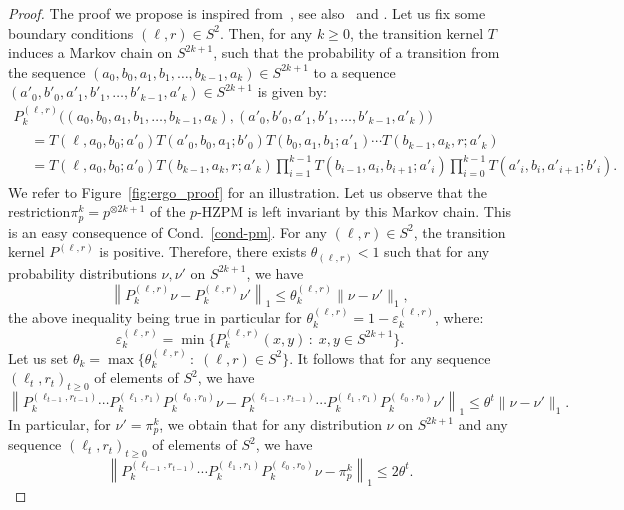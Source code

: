 \documentclass[10pt]{amsart}
\theoremstyle{definition}\newtheorem{defi}[theo]{Definition}\newtheorem{rema}[theo]{Remark}\newtheorem{exam}[theo]{Example}\newtheorem{exem}[theo]{Example}\newtheorem{nota}[theo]{Notation}
\newcounter{a}
\newcommand{\Cond}{Cond.}
\begin{document}
\begin{proof}
The proof we propose is inspired from~\cite{vasilyev}, see also~\cite{dobrushin} and \cite{marco_cie}. Let us fix some boundary conditions $(\ell, r)\in S^2$. Then, for any $k\geq 0$, the transition kernel $T$ induces a Markov chain on $S^{2k+1}$, such that the probability of a transition from the sequence $(a_0,b_0,a_1,b_1,\ldots, b_{k-1},a_{k})\in S^{2k+1}$ to a sequence $(a'_0,b'_0,a'_1,b'_1,\ldots, b'_{k-1},a'_{k})\in S^{2k+1}$ is given by:
\begin{multline*}
P_k^{(\ell,r)}\big((a_0,b_0,a_1,b_1,\ldots, b_{k-1},a_{k}), (a'_0,b'_0,a'_1,b'_1,\ldots, b'_{k-1},a'_{k})\big)\\
\begin{aligned}
& =T(\ell, a_0, b_0;a'_0)T(a'_0,b_0,a_1;b'_0)T(b_0, a_1, b_1;a'_1)\cdots T(b_{k-1},a_{k},r;a'_k)\\
& = T(\ell, a_0, b_0;a'_0)T(b_{k-1},a_{k},r;a'_k)\prod_{i=1}^{k-1}T(b_{i-1}, a_i, b_{i+1};a'_i)\prod_{i=0}^{k-1}T(a'_{i}, b_i, a'_{i+1};b'_i).
\end{aligned}
\end{multline*}
We refer to Figure~\ref{fig:ergo_proof} for an illustration. Let us observe that the restriction\linebreak $\pi^k_p=p^{\otimes 2k+1}$ of the $p$-HZPM is left invariant by this Markov chain. This is an easy consequence of \Cond~\ref{cond-pm}. For any $(\ell,r)\in S^2$, the transition kernel $P^{(\ell,r)}$ is positive. Therefore, there exists $\theta_{(\ell,r)}<1$ such that for any probability distributions $\nu, \nu'$ on $S^{2k+1}$, we have
\[
\left\|P_k^{(\ell,r)}\nu-P_k^{(\ell,r)}\nu'\right\|_1\leq \theta_k^{(\ell,r)} \|\nu-\nu'\|_1,
\]
the above inequality being true in particular for $\theta_k^{(\ell,r)}=1-\varepsilon_k^{(\ell,r)}$, where:
\[
\varepsilon_k^{(\ell,r)}=\min\{P_k^{(\ell,r)}(x,y) \, : \; x,y\in S^{2k+1}\}.
\]
Let us set $\theta_k=\max\{\theta_k^{(\ell,r)} \, : \; (\ell,r)\in S^2\}$. It follows that for any sequence $(\ell_t,r_t)_{t\geq 0}$ of elements of $S^2$, we have
\[
\left\|P_k^{(\ell_{t-1},r_{t-1})}\cdots P_k^{(\ell_{1},r_{1})}P_k^{(\ell_{0},r_{0})}\nu-P_k^{(\ell_{t-1},r_{t-1})}\cdots P_k^{(\ell_{1},r_{1})}P_k^{(\ell_{0},r_{0})}\nu'\right\|_1\leq \theta^t \|\nu-\nu'\|_1.
\]
In particular, for $\nu'=\pi^k_p$, we obtain that for any distribution $\nu$ on $S^{2k+1}$ and any sequence $(\ell_t,r_t)_{t\geq 0}$ of elements of $S^2$, we have
\[
\left\|P_k^{(\ell_{t-1},r_{t-1})}\cdots P_k^{(\ell_{1},r_{1})}P_k^{(\ell_{0},r_{0})}\nu-\pi^k_p\right\|_1\leq 2\theta^t.
\]
\end{proof}
\end{document}
